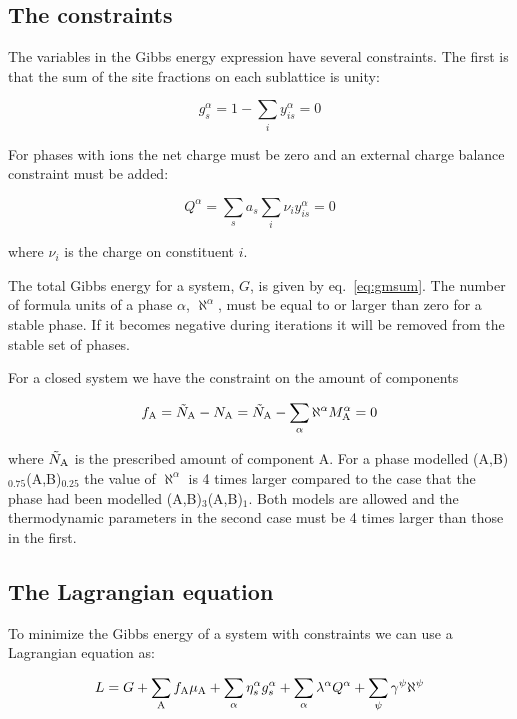 \documentclass[12pt]{article}
\begin{document}
\subsection{The constraints}

The variables in the Gibbs energy expression have several constraints.
The first is that the sum of the site fractions on each sublattice is
unity:

\begin{equation}
g^{\alpha}_s = 1 - \sum_i y^{\alpha}_{is} = 0
\end{equation}

For phases with ions the net charge must be zero and an external
charge balance constraint must be added:

\begin{equation}
Q^{\alpha} = \sum_s a_s \sum_i \nu_i y^{\alpha}_{is} = 0 \label{eq:qsum}
\end{equation}

\noindent
where $\nu_i$ is the charge on constituent $i$.

The total Gibbs energy for a system, $G$, is given by
eq.~\ref{eq:gmsum}.  The number of formula units of a phase $\alpha$,
$\aleph^{\alpha}$, must be equal to or larger than zero for a stable
phase.  If it becomes negative during iterations it will be removed
from the stable set of phases.

For a closed system we have the constraint on the amount of components

\begin{equation}
f_{\rm A}={\tilde N}_{\rm A}-N_{\rm A}={\tilde N}_{\rm
A}-\sum_{\alpha}\aleph^{\alpha}M^{\alpha}_{\rm A}=0
\end{equation}

\noindent
where ${\tilde N}_{\rm A}$ is the prescribed amount of component A.
For a phase modelled (A,B)$_{0.75}$(A,B)$_{0.25}$ the value of
$\aleph^{\alpha}$ is 4 times larger compared to the case that the
phase had been modelled (A,B)$_3$(A,B)$_1$.  Both models are allowed
and the thermodynamic parameters in the second case must be 4 times
larger than those in the first.

\subsection{The Lagrangian equation}

To minimize the Gibbs energy of a system with constraints we can use a
Lagrangian equation as:

\begin{equation}
L = G + \sum_{\rm A} f_{\rm A} \mu_{\rm A} +
\sum_{\alpha} \eta_s^{\alpha} g_{s}^{\alpha} +
\sum_{\alpha} \lambda^{\alpha} Q^{\alpha} +
\sum_{\psi} \gamma^{\psi} \aleph^{\psi}
\end{equation}
\end{document}

